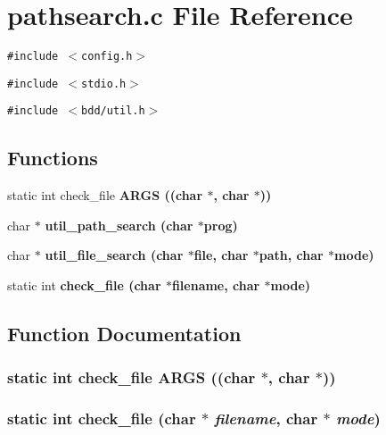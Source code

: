 \section{pathsearch.c File Reference}
\label{pathsearch_8c}
{\tt \#include $<$config.h$>$}\par
{\tt \#include $<$stdio.h$>$}\par
{\tt \#include $<$bdd/util.h$>$}\par
\subsection*{Functions}
\begin{CompactItemize}
\item 
static int check\_\-file \bf{ARGS} ((char $\ast$, char $\ast$))
\item 
char $\ast$ \bf{util\_\-path\_\-search} (char $\ast$prog)
\item 
char $\ast$ \bf{util\_\-file\_\-search} (char $\ast$file, char $\ast$path, char $\ast$mode)
\item 
static int \bf{check\_\-file} (char $\ast$filename, char $\ast$mode)
\end{CompactItemize}


\subsection{Function Documentation}
\subsubsection{\setlength{\rightskip}{0pt plus 5cm}static int check\_\-file ARGS ((char $\ast$, char $\ast$))\hspace{0.3cm}{\tt  [static]}}\label{pathsearch_8c_45ce397390ecefd66b45c9e6112895ee}


\subsubsection{\setlength{\rightskip}{0pt plus 5cm}static int check\_\-file (char $\ast$ {\em filename}, char $\ast$ {\em mode})\hspace{0.3cm}{\tt  [static]}}\label{pathsearch_8c_f3bbfa9466e2e672122e103da07b5bf0}




